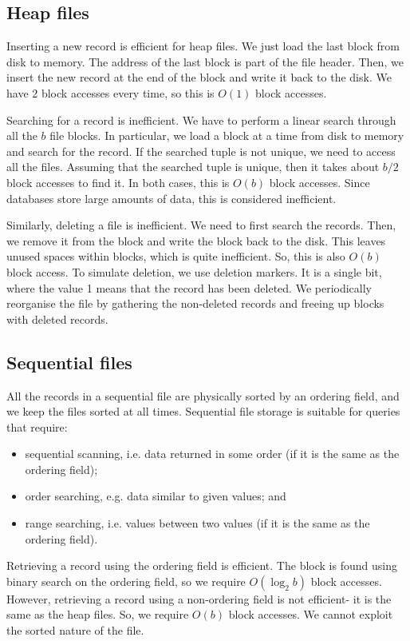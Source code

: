 \documentclass[a4paper, openany]{memoir}
\begin{document}
\subsection{Heap files}
Inserting a new record is efficient for heap files. We just load the last block from disk to memory. The address of the last block is part of the file header. Then, we insert the new record at the end of the block and write it back to the disk. We have 2 block accesses every time, so this is $O(1)$ block accesses.

Searching for a record is inefficient. We have to perform a linear search through all the $b$ file blocks. In particular, we load a block at a time from disk to memory and search for the record. If the searched tuple is not unique, we need to access all the files. Assuming that the searched tuple is unique, then it takes about $b/2$ block accesses to find it. In both cases, this is $O(b)$ block accesses. Since databases store large amounts of data, this is considered inefficient.

Similarly, deleting a file is inefficient. We need to first search the records. Then, we remove it from the block and write the block back to the disk. This leaves unused spaces within blocks, which is quite inefficient. So, this is also $O(b)$ block access. To simulate deletion, we use deletion markers. It is a single bit, where the value 1 means that the record has been deleted. We periodically reorganise the file by gathering the non-deleted records and freeing up blocks with deleted records.

\subsection{Sequential files}
All the records in a sequential file are physically sorted by an ordering field, and we keep the files sorted at all times. Sequential file storage is suitable for queries that require:
\begin{itemize}
    \item sequential scanning, i.e. data returned in some order (if it is the same as the ordering field);
    \item order searching, e.g. data similar to given values; and
    \item range searching, i.e. values between two values (if it is the same as the ordering field).
\end{itemize}

Retrieving a record using the ordering field is efficient. The block is found using binary search on the ordering field, so we require $O(\log_2 b)$ block accesses. However, retrieving a record using a non-ordering field is not efficient- it is the same as the heap files. So, we require $O(b)$ block accesses. We cannot exploit the sorted nature of the file.
\end{document}
